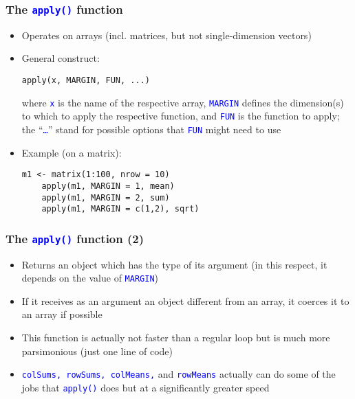 \documentclass[10pt]{beamer}
\newcommand{\cc}[1]{\texttt{\textcolor{blue}{#1}}}
\theoremstyle{definition}
\begin{document}
\begin{frame}[fragile]
\frametitle{The \cc{apply()} function}
\begin{itemize}
	\item Operates on arrays (incl. matrices, but not single-dimension vectors)
	\item General construct:
	\begin{lstlisting}[style = rstyle, breaklines]
	apply(x, MARGIN, FUN, ...)
	\end{lstlisting}
	where \cc{x} is the name of the respective array, \cc{MARGIN} defines the dimension(s) to which to apply the respective function, and \cc{FUN} is the function to apply; the ``\cc{\ldots}'' stand for possible options that \cc{FUN} might need to use
	\item Example (on a matrix):
	\begin{lstlisting}[style = rstyle, breaklines]
	m1 <- matrix(1:100, nrow = 10)
	apply(m1, MARGIN = 1, mean)
	apply(m1, MARGIN = 2, sum)
	apply(m1, MARGIN = c(1,2), sqrt)
	\end{lstlisting}
\end{itemize}
\end{frame}

\begin{frame}[fragile]
\frametitle{The \cc{apply()} function (2)}
\begin{itemize}
	\item Returns an object which has the type of its argument (in this respect, it depends on the value of \cc{MARGIN})
	\item If it receives as an argument an object different from an array, it coerces it to an array if possible
	\item This function is actually not faster than a regular loop but is much more parsimonious (just one line of code)
	\item \cc{colSums, rowSums, colMeans,} and \cc{rowMeans} actually can do some of the jobs that \cc{apply()} does but at a significantly greater speed
\end{itemize}
\end{frame}
\end{document}
